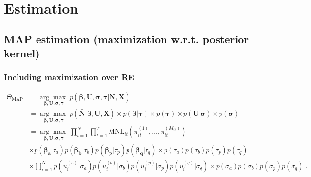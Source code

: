 \documentclass[a4paper,12pt]{scrartcl} %
\begin{document}
\section{Estimation}
\subsection{MAP estimation (maximization w.r.t. posterior kernel)}
\subsubsection{Including maximization over RE}
\begin{align*}
\Theta_{\text{MAP}}
&= \underset{\boldsymbol{\beta},\boldsymbol{U},\boldsymbol{\sigma},\boldsymbol{\tau}}{\arg\max \;}
p\left(\boldsymbol{\beta},\boldsymbol{U},\boldsymbol{\sigma},\boldsymbol{\tau}|\bar{\boldsymbol{N}},\boldsymbol{X}\right)\\
&= \underset{\boldsymbol{\beta},\boldsymbol{U},\boldsymbol{\sigma},\boldsymbol{\tau}}{\arg\max \;}
p\left(\bar{\boldsymbol{N}}|\boldsymbol{\beta},\boldsymbol{U},\boldsymbol{X}\right)
\times p\left(\boldsymbol{\beta}|\boldsymbol{\tau}\right)\times p(\boldsymbol{\tau})
\times p\left(\boldsymbol{U}|\boldsymbol{\sigma}\right)\times p(\boldsymbol{\sigma})\\
&= \underset{\boldsymbol{\beta},\boldsymbol{U},\boldsymbol{\sigma},\boldsymbol{\tau}}{\arg\max \;}
\prod_{i=1}^N \prod_{t=1}^T \text{MNL}_{it}\left(\pi_{it}^{(1)},\ldots,\pi_{it}^{(M_{it})}\right)\\
&\times 
p\left(\boldsymbol{\beta_a}|\tau_a\right)
p\left(\boldsymbol{\beta_b}|\tau_b\right)
p\left(\boldsymbol{\beta_p}|\tau_p\right)
p\left(\boldsymbol{\beta_q}|\tau_q\right)
\times p(\tau_a)p(\tau_b)p(\tau_p)p(\tau_q)
\\
&\times \prod_{i=1}^N
p\left(u_i^{(a)}|\sigma_{a}\right)p\left(u_i^{(b)}|\sigma_{b}\right)p\left(u_i^{(p)}|\sigma_{p}\right)p\left(u_i^{(q)}|\sigma_{q}\right)
\times p(\sigma_a)p(\sigma_b)p(\sigma_p)p(\sigma_q)\;.
\end{align*}
\end{document}
